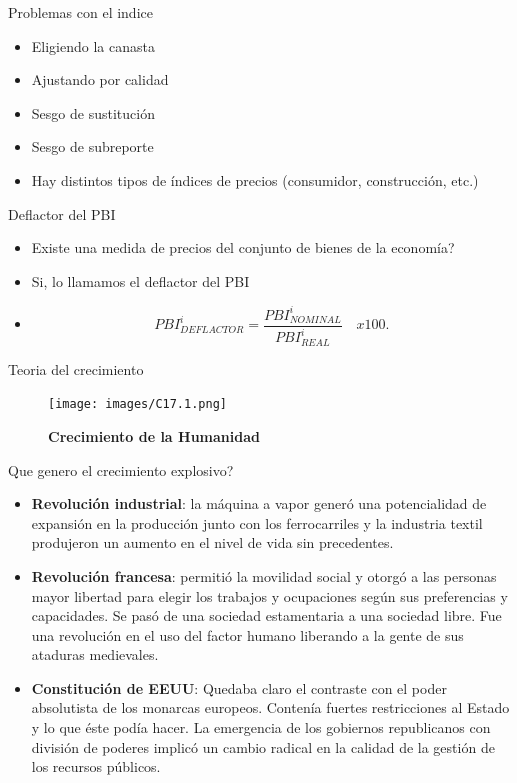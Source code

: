 \documentclass{beamer}
\begin{document}
\begin{frame}{Problemas con el indice}
    \begin{itemize}
        \item Eligiendo la canasta
        \item Ajustando por calidad
        \item Sesgo de sustitución
        \item Sesgo de subreporte
        \item Hay distintos tipos de índices de precios (consumidor, construcción, etc.)
    \end{itemize}
\end{frame}




\begin{frame}{Deflactor del PBI }
\begin{itemize}
\item Existe una medida de precios del conjunto de bienes de la economía? 
\item Si, lo llamamos el deflactor del PBI
\item 
  \begin{equation}
    PBI_{DEFLACTOR}^{i}=\frac{PBI_{NOMINAL}^{i}}{PBI_{REAL}^{i}}\quad x 100.
\end{equation} 
\end{itemize}
\end{frame}

\begin{frame}{Teoria del crecimiento}
    \begin{figure} [H]   \texttt{[image: images/C17.1.png]}
\caption{\textbf{Crecimiento de la Humanidad}}
\label{fig:26.1}
\end{figure}
\end{frame}


\begin{frame}{Que genero el crecimiento explosivo?}
    \begin{itemize}
    \item \textbf{Revolución industrial}: la máquina a vapor generó una potencialidad de expansión en la producción junto con los ferrocarriles y la industria textil produjeron un aumento en el nivel de vida sin precedentes. 
    \item \textbf{Revolución francesa}: permitió la movilidad social y otorgó a las personas mayor libertad para elegir los trabajos y ocupaciones según sus preferencias y capacidades. Se pasó de una sociedad estamentaria a una sociedad libre. Fue una revolución en el uso del factor humano liberando a la gente de sus ataduras medievales. 
    \item \textbf{Constitución de EEUU}: Quedaba claro el contraste con el poder absolutista de los monarcas europeos. Contenía fuertes restricciones al Estado y lo que éste podía hacer. La emergencia de los gobiernos republicanos con división de poderes implicó un cambio radical en la calidad de la gestión de los recursos públicos.  
\end{itemize}
\end{frame}
\end{document}
